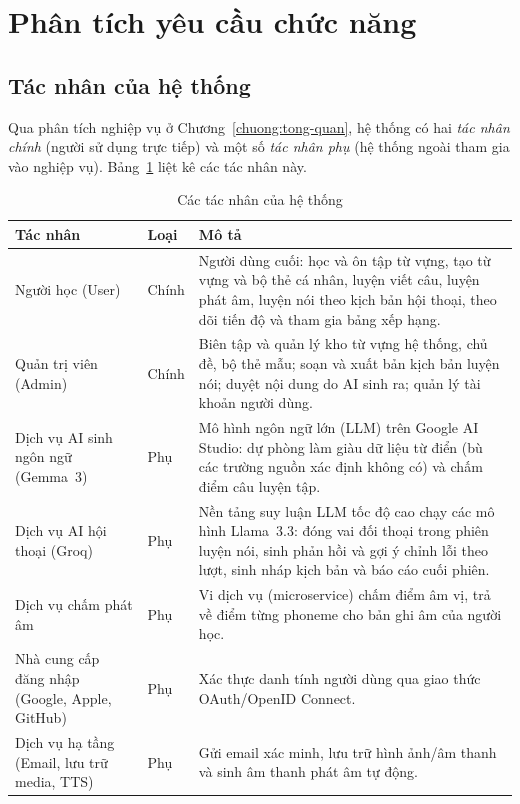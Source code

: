 \section{Phân tích yêu cầu chức năng}
\label{sec:phan-tich-chuc-nang}

\subsection{Tác nhân của hệ thống}
\label{subsec:tac-nhan}

Qua phân tích nghiệp vụ ở Chương~\ref{chuong:tong-quan}, hệ thống có hai
\textit{tác nhân chính} (người sử dụng trực tiếp) và một số \textit{tác nhân
phụ} (hệ thống ngoài tham gia vào nghiệp vụ). Bảng~\ref{tab:tac-nhan} liệt
kê các tác nhân này.

\begin{table}[h]
  \centering
  \small
  \renewcommand{\arraystretch}{1.3}
  \begin{tabular}{|p{3.2cm}|p{2.4cm}|p{9.0cm}|}
    \hline
    \textbf{Tác nhân} & \textbf{Loại} & \textbf{Mô tả} \\
    \hline
    Người học (User) & Chính & Người dùng cuối: học và ôn tập từ vựng, tạo từ vựng và bộ thẻ cá nhân, luyện viết câu, luyện phát âm, luyện nói theo kịch bản hội thoại, theo dõi tiến độ và tham gia bảng xếp hạng. \\
    \hline
    Quản trị viên (Admin) & Chính & Biên tập và quản lý kho từ vựng hệ thống, chủ đề, bộ thẻ mẫu; soạn và xuất bản kịch bản luyện nói; duyệt nội dung do AI sinh ra; quản lý tài khoản người dùng. \\
    \hline
    Dịch vụ AI sinh ngôn ngữ (Gemma~3) & Phụ & Mô hình ngôn ngữ lớn (LLM) trên Google AI Studio: dự phòng làm giàu dữ liệu từ điển (bù các trường nguồn xác định không có) và chấm điểm câu luyện tập. \\
    \hline
    Dịch vụ AI hội thoại (Groq) & Phụ & Nền tảng suy luận LLM tốc độ cao chạy các mô hình Llama~3.3: đóng vai đối thoại trong phiên luyện nói, sinh phản hồi và gợi ý chỉnh lỗi theo lượt, sinh nháp kịch bản và báo cáo cuối phiên. \\
    \hline
    Dịch vụ chấm phát âm & Phụ & Vi dịch vụ (microservice) chấm điểm âm vị, trả về điểm từng phoneme cho bản ghi âm của người học. \\
    \hline
    Nhà cung cấp đăng nhập (Google, Apple, GitHub) & Phụ & Xác thực danh tính người dùng qua giao thức OAuth/OpenID Connect. \\
    \hline
    Dịch vụ hạ tầng (Email, lưu trữ media, TTS) & Phụ & Gửi email xác minh, lưu trữ hình ảnh/âm thanh và sinh âm thanh phát âm tự động. \\
    \hline
  \end{tabular}
  \caption{Các tác nhân của hệ thống}
  \label{tab:tac-nhan}
\end{table}

